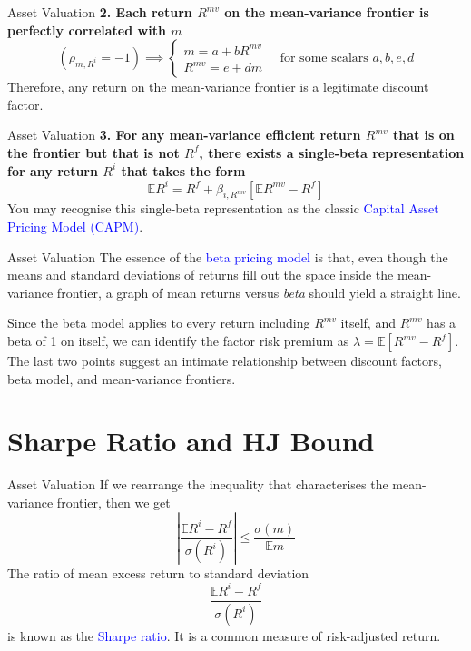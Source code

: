 \documentclass[aspectratio=169,xcolor=dvipsnames]{beamer}
\begin{document}
\begin{frame}{Asset Valuation}
    \textbf{2. Each return $R^{mv}$ on the mean-variance frontier is perfectly correlated with $m$}
    \[
        (\rho_{m, R^i} = -1) \implies \begin{cases} m = a + b R^{mv} \\ R^{mv} = e + dm \end{cases} \quad \text{for some scalars } a, b, e, d
    \]
    Therefore, any return on the mean-variance frontier is a legitimate discount factor.
\end{frame}

\begin{frame}{Asset Valuation}
    \textbf{3. For any mean-variance efficient return $R^{mv}$ that is on the frontier but that is not $R^f$, there exists a single-beta representation for any return $R^i$ that takes the form}
    \[
        \mathbb{E} R^i = R^f + \beta_{i, R^{mv}} \left[ \mathbb{E} R^{mv} - R^f \right]
    \]
    You may recognise this single-beta representation as the classic \textcolor{blue}{Capital Asset Pricing Model (CAPM)}.
\end{frame}

\begin{frame}{Asset Valuation}
    The essence of the \textcolor{blue}{beta pricing model} is that, even though the means and standard deviations of returns fill out the space inside the mean-variance frontier, a graph of mean returns versus \emph{beta} should yield a straight line.

    Since the beta model applies to every return including $R^{mv}$ itself, and $R^{mv}$ has a beta of 1 on itself, we can identify the factor risk premium as $\lambda = \mathbb{E}[R^{mv} - R^f]$. The last two points suggest an intimate relationship between discount factors, beta model, and mean-variance frontiers.
\end{frame}

\section{Sharpe Ratio and HJ Bound}

\begin{frame}{Asset Valuation}
    If we rearrange the inequality that characterises the mean-variance frontier, then we get
    \[
        \left| \frac{\mathbb{E} R^i - R^f}{\sigma(R^i)} \right| \le \frac{\sigma(m)}{\mathbb{E} m}
    \]
    The ratio of mean excess return to standard deviation
    \[
        \frac{\mathbb{E} R^i - R^f}{\sigma(R^i)}
    \]
    is known as the \textcolor{blue}{Sharpe ratio}. It is a common measure of risk-adjusted return.
\end{frame}
\end{document}
